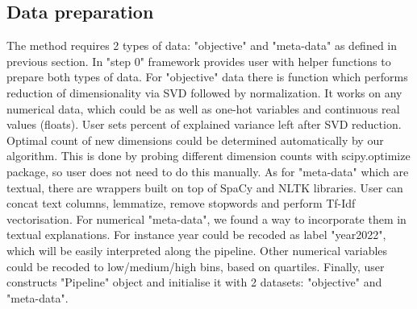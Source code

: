 \documentclass[
 twocolumn,
]{ceurart}
\begin{document}
\subsection{Data preparation}
The method requires 2 types of data: "objective" and "meta-data" as defined in previous section.
In "step 0" framework provides user with helper functions to prepare both types of data.
For "objective" data there is function which performs reduction of dimensionality via SVD followed by normalization.
It works on any numerical data, which could be as well as one-hot variables and continuous real values (floats).
User sets percent of explained variance left after SVD reduction.
Optimal count of new dimensions could be determined automatically by our algorithm.
This is done by probing different dimension counts with scipy.optimize package, so user does not need to do this manually.
As for "meta-data" which are textual, there are wrappers built on top of SpaCy and NLTK libraries.
User can concat text columns, lemmatize, remove stopwords and perform Tf-Idf vectorisation.
For numerical "meta-data", we found a way to incorporate them in textual explanations.
For instance year could be recoded as label "year2022", which will be easily interpreted along the pipeline.
Other numerical variables could be recoded to low/medium/high bins, based on quartiles.
Finally, user constructs "Pipeline" object and initialise it with 2 datasets: "objective" and "meta-data".
\end{document}

